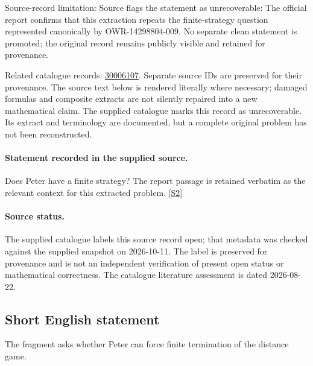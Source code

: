 \documentclass[11pt]{article}
\begin{document}
Source-record limitation: Source flags the statement as unrecoverable: The official report confirms that this extraction repeats the finite-strategy question represented canonically by OWR-14298804-009. No separate clean statement is promoted; the original record remains publicly visible and retained for provenance.

Related catalogue records: \href{https://mehmetmars7.github.io/Erdosproblems-llm-hunter/problem.html?type=open_problems&id=30006107}{30006107}. Separate source IDs are preserved for their provenance.
The source text below is rendered literally where necessary; damaged formulas and composite extracts are not silently repaired into a new mathematical claim.
The supplied catalogue marks this record as unrecoverable. Its extract and terminology are documented, but a complete original problem has not been reconstructed.
\paragraph{Statement recorded in the supplied source.}
Does Peter have a ﬁnite strategy? The report passage is retained verbatim as the relevant context for this extracted problem. \href{https://doi.org/10.4171/owr/2024/50}{[S2]}
\paragraph{Source status.}
The supplied catalogue labels this source record open; that metadata was checked against the supplied snapshot on 2026-10-11. The label is preserved for provenance and is not an independent verification of present open status or mathematical correctness. The catalogue literature assessment is dated 2026-08-22.
\subsection{Short English statement}
The fragment asks whether Peter can force finite termination of the distance game.
\end{document}
